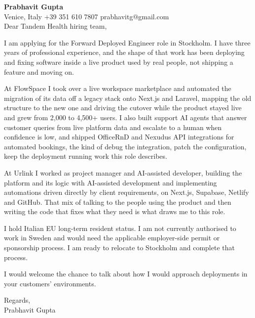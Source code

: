 \documentclass[a4paper,10.5pt]{article}
\begin{document}
\textbf{Prabhavit Gupta}\\
Venice, Italy \textbar{} +39 351 610 7807 \textbar{} prabhavitg@gmail.com\\[10pt]
Dear Tandem Health hiring team,

I am applying for the Forward Deployed Engineer role in Stockholm. I have three years of professional experience, and the shape of that work has been deploying and fixing software inside a live product used by real people, not shipping a feature and moving on.

At FlowSpace I took over a live workspace marketplace and automated the migration of its data off a legacy stack onto Next.js and Laravel, mapping the old structure to the new one and driving the cutover while the product stayed live and grew from 2,000 to 4,500+ users. I also built support AI agents that answer customer queries from live platform data and escalate to a human when confidence is low, and shipped OfficeRnD and Nexudus API integrations for automated bookings, the kind of debug the integration, patch the configuration, keep the deployment running work this role describes.

At Urlink I worked as project manager and AI-assisted developer, building the platform and its logic with AI-assisted development and implementing automations driven directly by client requirements, on Next.js, Supabase, Netlify and GitHub. That mix of talking to the people using the product and then writing the code that fixes what they need is what draws me to this role.

I hold Italian EU long-term resident status. I am not currently authorised to work in Sweden and would need the applicable employer-side permit or sponsorship process. I am ready to relocate to Stockholm and complete that process.

I would welcome the chance to talk about how I would approach deployments in your customers' environments.

Regards,\\
Prabhavit Gupta
\end{document}
